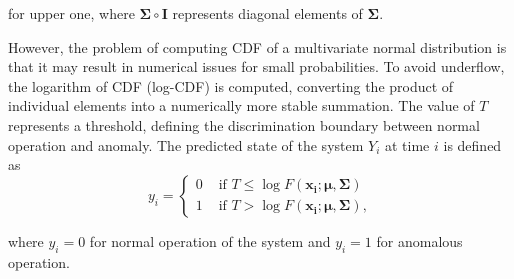 for upper one, where $\boldsymbol{\Sigma}\circ\boldsymbol{I}$ represents diagonal elements of $\boldsymbol{\Sigma}$.

However, the problem of computing CDF of a multivariate normal distribution is that it may result in numerical issues for small probabilities. To avoid underflow, the logarithm of CDF (log-CDF) is computed, converting the product of individual elements into a numerically more stable summation. The value of $T$ represents a threshold, defining the discrimination boundary between normal operation and anomaly. The predicted state of the system $Y_i$ at time $i$ is defined as
\begin{equation}
y_i =
  \begin{cases}
     0 & \text{ if } T \leq \log{F(\boldsymbol{x_i}; \boldsymbol{\mu}, \boldsymbol{\Sigma})} \\
     1 & \text{ if }  T > \log{F(\boldsymbol{x_i}; \boldsymbol{\mu}, \boldsymbol{\Sigma})}\text{,}\label{eq:anomaly}
  \end{cases}
\end{equation}

where $y_i = 0$ for normal operation of the system and $y_i = 1$ for anomalous operation.
